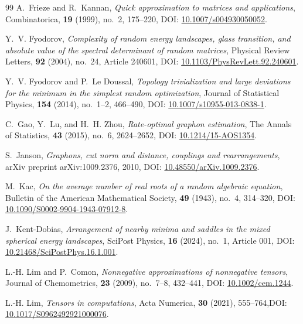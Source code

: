 \documentclass[11pt,a4paper,reqno]{amsart}
\theoremstyle{definition}
\numberwithin{equation}{section}
\begin{document}
\begin{thebibliography}{99}
A.~Frieze and R.~Kannan,
\emph{Quick approximation to matrices and applications},
Combinatorica, \textbf{19} (1999), no.~2, 175--220, DOI: \href{https://doi.org/10.1007/s004930050052}{10.1007/s004930050052}.

Y.~V. Fyodorov,
\emph{Complexity of random energy landscapes, glass transition, and absolute value of the spectral determinant of random matrices},
Physical Review Letters, \textbf{92} (2004), no.~24, Article 240601, DOI: \href{https://doi.org/10.1103/PhysRevLett.92.240601}{10.1103/PhysRevLett.92.240601}.

Y.~V. Fyodorov and P.~Le Doussal,
\emph{Topology trivialization and large deviations for the minimum in the simplest random optimization},
Journal of Statistical Physics, \textbf{154} (2014), no.~1--2, 466--490, DOI: \href{https://doi.org/10.1007/s10955-013-0838-1}{10.1007/s10955-013-0838-1}.

C.~Gao, Y.~Lu, and H.~H. Zhou,
\emph{Rate-optimal graphon estimation},
The Annals of Statistics, \textbf{43} (2015), no.~6, 2624--2652, DOI: \href{https://doi.org/10.1214/15-AOS1354}{10.1214/15-AOS1354}.

S.~Janson,
\emph{Graphons, cut norm and distance, couplings and rearrangements},
arXiv preprint arXiv:1009.2376, 2010, DOI: \href{https://doi.org/10.48550/arXiv.1009.2376}{10.48550/arXiv.1009.2376}.

M.~Kac,
\emph{On the average number of real roots of a random algebraic equation},
Bulletin of the American Mathematical Society, \textbf{49} (1943), no.~4, 314--320, DOI: \href{https://doi.org/10.1090/S0002-9904-1943-07912-8}{10.1090/S0002-9904-1943-07912-8}.

J.~Kent-Dobias,
\emph{Arrangement of nearby minima and saddles in the mixed spherical energy landscapes},
SciPost Physics, \textbf{16} (2024), no.~1, Article 001, DOI: \href{https://doi.org/10.21468/SciPostPhys.16.1.001}{10.21468/SciPostPhys.16.1.001}.

L.-H. Lim and P.~Comon,
\emph{Nonnegative approximations of nonnegative tensors},
Journal of Chemometrics, \textbf{23} (2009), no.~7--8, 432--441, DOI: \href{https://doi.org/10.1002/cem.1244}{10.1002/cem.1244}.

L.-H. Lim,
\emph{Tensors in computations},
Acta Numerica, \textbf{30} (2021), 555--764,\newline DOI: \href{https://doi.org/10.1017/S0962492921000076}{10.1017/S0962492921000076}.


\end{thebibliography}
\end{document}
